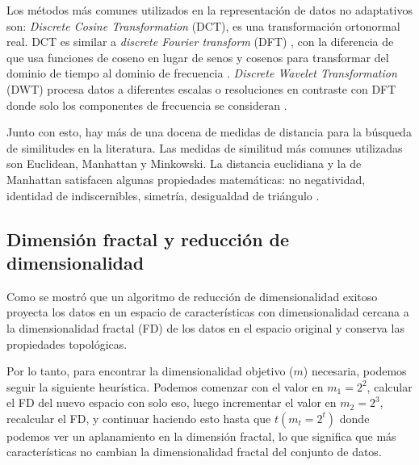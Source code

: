 Los métodos más comunes utilizados en la representación de datos no adaptativos son: \textit{Discrete Cosine Transformation} (DCT), es una transformación ortonormal real. DCT es similar a \textit{discrete Fourier transform} (DFT) \cite{Faloutsos94}, con la diferencia de que usa funciones de coseno en lugar de senos y cosenos para transformar del dominio de tiempo al dominio de frecuencia \cite{Bettaiah14}. \textit{Discrete Wavelet Transformation} (DWT) procesa datos a diferentes escalas o resoluciones en contraste con DFT \cite{Faloutsos94} donde solo los componentes de frecuencia se consideran  \cite{Bettaiah14}.

Junto con esto, hay más de una docena de medidas de distancia para la búsqueda de similitudes en la literatura. Las medidas de similitud más comunes utilizadas son Euclidean, Manhattan y Minkowski. La distancia euclidiana y la de Manhattan satisfacen algunas propiedades matemáticas: no negatividad, identidad de indiscernibles, simetría, desigualdad de triángulo \cite{han2011data}.

\subsection{Dimensión fractal y reducción de dimensionalidad}
Como se mostró \cite{citeulike:fractal:encoders} que un algoritmo de reducción de dimensionalidad exitoso proyecta los datos en un espacio de características con dimensionalidad cercana a la dimensionalidad fractal (FD) de los datos en el espacio original y conserva las propiedades topológicas.

Por lo tanto, para encontrar la dimensionalidad objetivo ($ m $) necesaria, podemos seguir la siguiente heurística. Podemos comenzar con el valor en $ m_1 = 2^2 $, calcular el FD del nuevo espacio con solo eso, luego incrementar el valor en $ m_2 = 2^3 $, recalcular el FD, y continuar haciendo esto hasta que $ t(m_t = 2^t) $ donde podemos ver un aplanamiento en la dimensión fractal, lo que significa que más características no cambian la dimensionalidad fractal del conjunto de datos.


